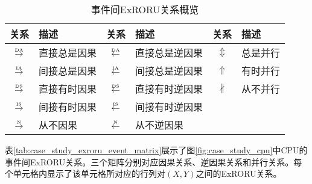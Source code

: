 \begin{table}[htbp]
  \centering
  \begin{minipage}[t]{0.8\textwidth}
  	\caption{事件间ExRORU关系概览}
  	\label{tab:exroru_event}
  	\begin{tabularx}{\textwidth}{clclcl}
  	  \toprule[1.5pt]
  	  关系 & 描述 & 关系 & 描述 & 关系 & 描述 \\\midrule[1pt]
  	  $\overset{\text{\tiny{DA}}}{\rightarrow}$ & 直接总是因果 & $\overset{\text{\tiny{DA}}}{\leftarrow}$ & 直接总是逆因果 & $\Updownarrow$ & 总是并行\\
  	  $\overset{\text{\tiny{IA}}}{\rightarrow}$ & 间接总是因果 & $\overset{\text{\tiny{IA}}}{\leftarrow}$ & 间接总是逆因果 & $\Uparrow$ & 有时并行\\
  	  $\overset{\text{\tiny{DS}}}{\rightarrow}$ & 直接有时因果 & $\overset{\text{\tiny{DS}}}{\leftarrow}$ & 直接有时逆因果 & $\nparallel$ & 从不并行\\
  	  $\overset{\text{\tiny{IS}}}{\rightarrow}$ & 间接有时因果 & $\overset{\text{\tiny{IS}}}{\leftarrow}$ & 间接有时逆因果 & & \\
  	  $\overset{\text{\tiny{N}}}{\rightarrow}$ & 从不因果 & $\overset{\text{\tiny{N}}}{\leftarrow}$ & 从不逆因果 & & \\
  	  \bottomrule[1.5pt]
  	\end{tabularx}
  \end{minipage}
\end{table}

\begin{example}\label{ex:case_study_exroru_event_matrix}
表\ref{tab:case_study_exroru_event_matrix}展示了图\ref{fig:case_study_cpu}中CPU的事件间ExRORU关系。三个矩阵分别对应因果关系、逆因果关系和并行关系。每个单元格内显示了该单元格所对应的行列对$(X,Y)$之间的ExRORU关系。
\end{example}

